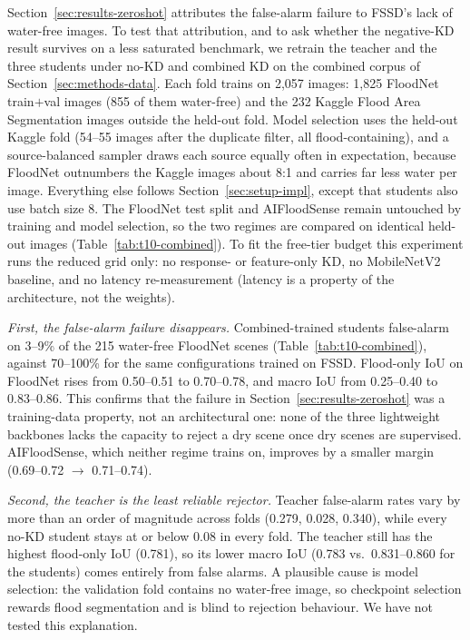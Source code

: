 Section~\ref{sec:results-zeroshot} attributes the false-alarm failure to FSSD's lack of water-free images. To test that attribution, and to ask whether the negative-KD result survives on a less saturated benchmark, we retrain the teacher and the three students under no-KD and combined KD on the combined corpus of Section~\ref{sec:methods-data}. Each fold trains on 2{,}057 images: 1{,}825 FloodNet train$+$val images (855 of them water-free) and the 232 Kaggle Flood Area Segmentation images outside the held-out fold. Model selection uses the held-out Kaggle fold (54--55 images after the duplicate filter, all flood-containing), and a source-balanced sampler draws each source equally often in expectation, because FloodNet outnumbers the Kaggle images about 8:1 and carries far less water per image. Everything else follows Section~\ref{sec:setup-impl}, except that students also use batch size 8. The FloodNet test split and AIFloodSense remain untouched by training and model selection, so the two regimes are compared on identical held-out images (Table~\ref{tab:t10-combined}). To fit the free-tier budget this experiment runs the reduced grid only: no response- or feature-only KD, no MobileNetV2 baseline, and no latency re-measurement (latency is a property of the architecture, not the weights).



\emph{First, the false-alarm failure disappears.} Combined-trained students false-alarm on 3--9\% of the 215 water-free FloodNet scenes (Table~\ref{tab:t10-combined}), against 70--100\% for the same configurations trained on FSSD. Flood-only IoU on FloodNet rises from 0.50--0.51 to 0.70--0.78, and macro IoU from 0.25--0.40 to 0.83--0.86. This confirms that the failure in Section~\ref{sec:results-zeroshot} was a training-data property, not an architectural one: none of the three lightweight backbones lacks the capacity to reject a dry scene once dry scenes are supervised. AIFloodSense, which neither regime trains on, improves by a smaller margin (0.69--0.72 $\rightarrow$ 0.71--0.74).

\emph{Second, the teacher is the least reliable rejector.} Teacher false-alarm rates vary by more than an order of magnitude across folds (0.279, 0.028, 0.340), while every no-KD student stays at or below 0.08 in every fold. The teacher still has the highest flood-only IoU (0.781), so its lower macro IoU (0.783 vs.\ 0.831--0.860 for the students) comes entirely from false alarms. A plausible cause is model selection: the validation fold contains no water-free image, so checkpoint selection rewards flood segmentation and is blind to rejection behaviour. We have not tested this explanation.

